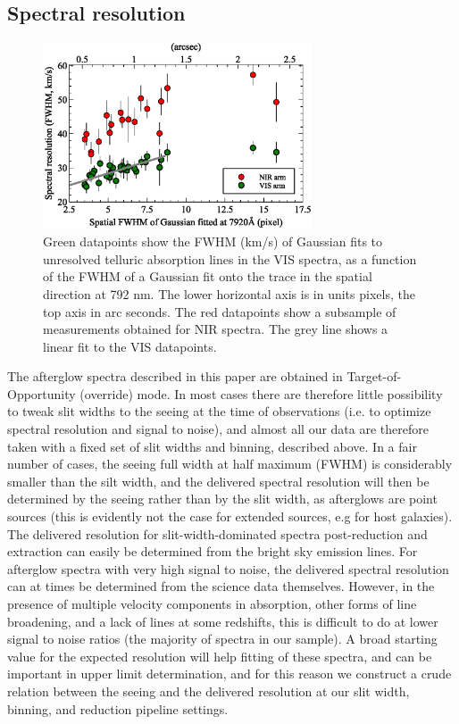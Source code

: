 \documentclass{aa}    %
\begin{document}
\subsection{Spectral resolution} \label{resolution}


\begin{figure}[!ht]
	\centerline{\includegraphics[width=8cm]{figures/resolution_paper.eps}}
\caption{Green datapoints show the FWHM (km/s) of Gaussian fits to unresolved
	telluric absorption lines in the VIS spectra, as a function of the FWHM of a
	Gaussian fit onto the trace in the spatial direction at 792 nm. The lower
	horizontal axis is in units pixels, the top axis in arc seconds. The red
	datapoints show a subsample of measurements obtained for NIR spectra. The grey
	line shows a linear fit to the VIS datapoints. } \label{fig:res}
\end{figure}


The afterglow spectra described in this paper are obtained in
Target-of-Opportunity (override) mode. In most cases there are therefore little
possibility to tweak slit widths to the seeing at the time of observations (i.e.
to optimize spectral resolution and signal to noise), and almost all our data are
therefore taken with a fixed set of slit widths and binning, described above. In
a fair number of cases, the seeing full width at half maximum (FWHM) is
considerably smaller than the silt width, and the delivered spectral resolution
will then be determined by the seeing rather than by the slit width, as afterglows are
point sources (this is evidently not the case for extended sources, e.g for host
galaxies). The delivered resolution for slit-width-dominated spectra
post-reduction and extraction can easily be determined from the bright sky
emission lines. For afterglow spectra with very high signal to noise, the
delivered spectral resolution can at times be determined from the science data
themselves. However, in the presence of multiple velocity components in
absorption, other forms of line broadening, and a lack of lines at some
redshifts, this is difficult to do at lower signal to noise ratios (the
majority of spectra in our sample). A broad starting value for the expected
resolution will help fitting of these spectra, and can be important in upper
limit determination, and for this reason we construct a crude relation between
the seeing and the delivered resolution at our slit width, binning, and
reduction pipeline settings. 
\end{document}
